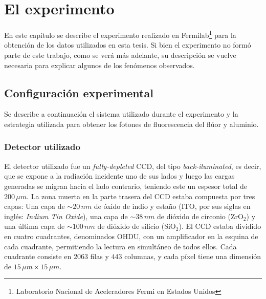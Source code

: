 \chapter{El experimento \label{chap:ConfiguracionExperimental}}

\noindent En este capítulo se describe el experimento realizado en Fermilab\footnote{Laboratorio Nacional de Aceleradores Fermi en Estados Unidos} para la obtención de los datos utilizados en esta tesis. Si bien el experimento no formó parte de este trabajo, como se verá más adelante, su descripción se vuelve necesaria para explicar algunos de los fenómenos observados.

\section{Configuración experimental}
\noindent Se describe a continuación el sistema utilizado durante el experimento y la estrategia utilizada para obtener los fotones de fluorescencia del flúor y aluminio.

\subsection{Detector utilizado \label{subsec:detector}}
\noindent El detector utilizado fue un \textit{fully-depleted} CCD, del tipo \textit{back-iluminated}, es decir, que se expone a la radiación incidente uno de sus lados y luego las cargas generadas se migran hacia el lado contrario, teniendo este un espesor total de $200\,\si{\mu m}$. La zona muerta en la parte trasera del CCD estaba compuesta por tres capas: Una capa de $\sim 20\,\si{nm}$ de óxido de indio y estaño (ITO, por sus siglas en inglés: \textit{Indium Tin Oxide}), una capa de $\sim 38\,\si{nm}$ de dióxido de circonio (ZrO$_{2}$) y una última capa de $\sim 100\,\si{nm}$ de dióxido de silicio (SiO$_{2}$). El CCD estaba dividido en cuatro cuadrantes, denominados OHDU, con un amplificador en la esquina de cada cuadrante, permitiendo la lectura en simultáneo de todos ellos. Cada cuadrante consiste en $2063$ filas y $443$ columnas, y cada píxel tiene una dimensión de $15\,\si{\mu m} \times 15\,\si{\mu m}$.

